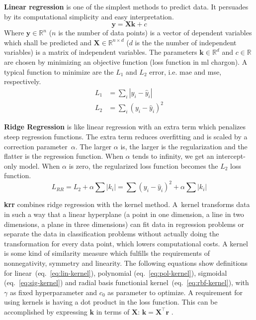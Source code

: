 %
\textbf{Linear regression} is one of the simplest methods to predict data. 
It persuades by its computational simplicity and easy interpretation. 
\begin{equation}
\mathbf{y} = \mathbf{X} \mathbf{k} +c 
\end{equation}
Where $\mathbf{y} \in \mathbb{R}^n$ ($n$ is the number of data points) is a vector of dependent variables which shall be predicted and $\mathbf{X}\in \mathbb{R}^{n\times d}$ ($d$ is the the number of independent variables) is a matrix of independent variables. 
The parameters $\mathbf{k} \in \mathbb{R}^d$ and $c \in \mathbb{R}$ are chosen by minimizing an objective function (loss function in \gls{ml} chargon).
A typical function to minimize are the $L_1$ and $L_2$ error, i.e. \gls{mae} and \gls{mse}, respectively.
\begin{align}
L_1&= \sum_i |y_i - \hat y_i| \\%
L_2&= \sum_i(y_i - \hat y_i)^2 %
\end{align}
%

\textbf{Ridge Regression} is like linear regression with an extra term which penalizes steep regression functions.
The extra term reduces overfitting and is scaled by a correction parameter~$\alpha$. 
The larger $\alpha$ is, the larger is the regularization and the flatter is the regression function. 
When $\alpha$ tends to infinity, we get an intercept-only model.
When $\alpha$ is zero, the regularized loss function becomes the $L_2$ loss function.
\begin{equation}
    L_{RR} = L_2 + \alpha \sum |k_i| = \sum(y_i - \hat y_i)^2 + \alpha \sum |k_i| 
\end{equation}

\textbf{\Gls{krr}} combines ridge regression with the kernel method. 
A~kernel transforms data in such a way that a linear hyperplane (a point in one dimension, a line in two dimensions, 
a plane in three dimensions) can fit data in regression problems or separate the data in classification problems without actually doing the transformation for every data point, which lowers computational costs.
A kernel is some kind of similarity measure 
which fulfills the requirements of nonnegativity, symmetry and linearity\cite{rupp2015machine}.
The following equations show definitions for 
linear~(eq.~\ref{eq:lin-kernel}), 
polynomial (eq.~\ref{eq:pol-kernel}), 
sigmoidal (eq.~\ref{eq:sig-kernel}) and 
radial basis functionial kernel~(eq.~\ref{eq:rbf-kernel}), with $\gamma$ as fixed hyperparameter and $c_0$ as parameter to optimize.
A requirement for using kernels is having a dot product in the loss function. 
This can be accomplished by expressing $\mathbf{k}$ in terms of $\mathbf{X}$: $\mathbf{k}=\mathbf{X}^\top \mathbf{r}$
\cite{rudin2020least}.

